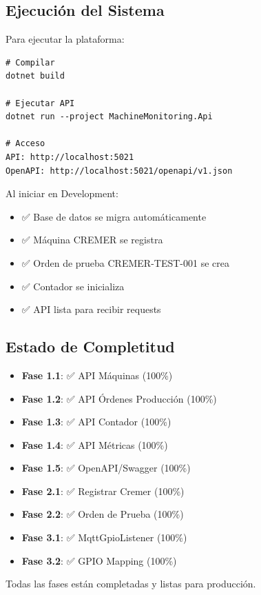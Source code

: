 \subsection{Ejecución del Sistema}

Para ejecutar la plataforma:

\begin{verbatim}
# Compilar
dotnet build

# Ejecutar API
dotnet run --project MachineMonitoring.Api

# Acceso
API: http://localhost:5021
OpenAPI: http://localhost:5021/openapi/v1.json
\end{verbatim}

Al iniciar en Development:
\begin{itemize}
    \item ✅ Base de datos se migra automáticamente
    \item ✅ Máquina CREMER se registra
    \item ✅ Orden de prueba CREMER-TEST-001 se crea
    \item ✅ Contador se inicializa
    \item ✅ API lista para recibir requests
\end{itemize}

\subsection{Estado de Completitud}

\begin{itemize}
    \item \textbf{Fase 1.1}: ✅ API Máquinas (100\%)
    \item \textbf{Fase 1.2}: ✅ API Órdenes Producción (100\%)
    \item \textbf{Fase 1.3}: ✅ API Contador (100\%)
    \item \textbf{Fase 1.4}: ✅ API Métricas (100\%)
    \item \textbf{Fase 1.5}: ✅ OpenAPI/Swagger (100\%)
    \item \textbf{Fase 2.1}: ✅ Registrar Cremer (100\%)
    \item \textbf{Fase 2.2}: ✅ Orden de Prueba (100\%)
    \item \textbf{Fase 3.1}: ✅ MqttGpioListener (100\%)
    \item \textbf{Fase 3.2}: ✅ GPIO Mapping (100\%)
\end{itemize}

Todas las fases están completadas y listas para producción.

